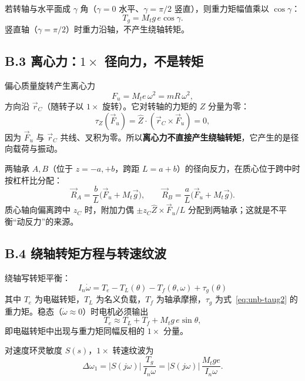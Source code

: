 若转轴与水平面成 $\gamma$ 角（$\gamma=0$ 水平、$\gamma=\pi/2$ 竖直），则重力矩幅值乘以 $\cos\gamma$：
\begin{equation}
T_g=M_t g\,e\cos\gamma .
\label{eq:unb-gamma}
\end{equation}
竖直轴（$\gamma=\pi/2$）时重力沿轴，不产生绕轴转矩。

\subsection*{B.3 离心力：$1\times$ 径向力，不是转矩}

偏心质量旋转产生离心力
\begin{equation}
F_u=M_t e\,\omega^2=m R\,\omega^2,
\label{eq:unb-Fu}
\end{equation}
方向沿 $\vec r_C$（随转子以 $1\times$ 旋转）。它对转轴的力矩的 $Z$ 分量为零：
\begin{equation}
\tau_Z(\vec F_u)=\hat Z\cdot(\vec r_C\times\vec F_u)=0,
\label{eq:unb-tauFu}
\end{equation}
因为 $\vec F_u$ 与 $\vec r_C$ 共线、叉积为零。所以\textbf{离心力不直接产生绕轴转矩}，它产生的是径向载荷与振动。

两轴承 $A,B$（位于 $z=-a,+b$，跨距 $L=a+b$）的径向反力，在质心位于跨中时按杠杆比分配：
\begin{equation}
\vec R_A=\frac{b}{L}\bigl(\vec F_u+M_t\vec g\bigr),\qquad
\vec R_B=\frac{a}{L}\bigl(\vec F_u+M_t\vec g\bigr).
\end{equation}
质心轴向偏离跨中 $z_C$ 时，附加力偶 $\pm z_C\hat Z\times\vec F_u/L$ 分配到两轴承；这就是不平衡“动反力”的来源。

\subsection*{B.4 绕轴转矩方程与转速纹波}

绕轴写转矩平衡：
\begin{equation}
\boxed{\;I_n\dot\omega=T_e-T_L(\theta)-T_f(\theta,\omega)+\tau_g(\theta)\;}
\label{eq:unb-torque}
\end{equation}
其中 $T_e$ 为电磁转矩，$T_L$ 为名义负载，$T_f$ 为轴承摩擦，$\tau_g$ 为式~\eqref{eq:unb-taug2} 的重力矩。稳态（$\dot\omega\approx0$）时电机必须输出
\begin{equation}
T_e\approx T_L+T_f+M_t g\,e\sin\theta,
\end{equation}
即电磁转矩中出现与重力矩同幅反相的 $1\times$ 分量。

对速度环灵敏度 $S(s)$，$1\times$ 转速纹波为
\begin{equation}
\Delta\omega_1=|S(j\omega)|\,\frac{T_g}{I_n\omega}
=|S(j\omega)|\,\frac{M_t g e}{I_n\omega}.
\label{eq:unb-dw}
\end{equation}

